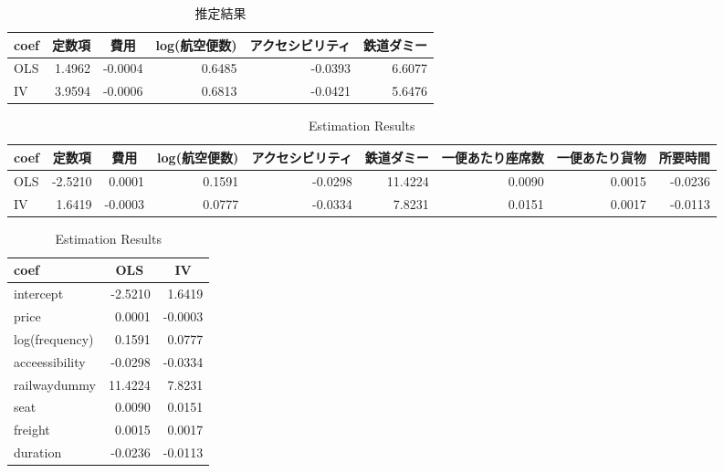 \documentclass{jsarticle}
\begin{document}
\begin{table}[h]
\caption{推定結果\label{coef}} 
\begin{center}
\begin{tabular}{lrrrrr}
\hline\hline
\multicolumn{1}{l}{coef}&\multicolumn{1}{c}{定数項}&\multicolumn{1}{c}{費用}&\multicolumn{1}{c}{log(航空便数)}&\multicolumn{1}{c}{アクセシビリティ}&\multicolumn{1}{c}{鉄道ダミー}\tabularnewline
\hline
OLS&1.4962&-0.0004&0.6485&-0.0393&6.6077\tabularnewline
IV&3.9594&-0.0006&0.6813&-0.0421&5.6476\tabularnewline
\hline
\end{tabular}\end{center}
\end{table}

\begin{table}[h]
\caption{Estimation Results\label{coef}} 
\begin{center}
\begin{tabular}{lrrrrrrrr}
\hline\hline
\multicolumn{1}{l}{coef}&\multicolumn{1}{c}{定数項}&\multicolumn{1}{c}{費用}&\multicolumn{1}{c}{log(航空便数)}&\multicolumn{1}{c}{アクセシビリティ}&\multicolumn{1}{c}{鉄道ダミー}&\multicolumn{1}{c}{一便あたり座席数}&\multicolumn{1}{c}{一便あたり貨物}&\multicolumn{1}{c}{所要時間}\tabularnewline
\hline
OLS&-2.5210&0.0001&0.1591&-0.0298&11.4224&0.0090&0.0015&-0.0236\tabularnewline
IV&1.6419&-0.0003&0.0777&-0.0334&7.8231&0.0151&0.0017&-0.0113\tabularnewline
\hline
\end{tabular}\end{center}
\end{table}

\begin{table}[h]
\caption{Estimation Results\label{coef}} 
\begin{center}
\begin{tabular}{lrr}
\hline\hline
\multicolumn{1}{l}{coef}&\multicolumn{1}{c}{OLS}&\multicolumn{1}{c}{IV}\tabularnewline
\hline
intercept&-2.5210&1.6419\tabularnewline
price&0.0001&-0.0003\tabularnewline
log(frequency)&0.1591&0.0777\tabularnewline
acceessibility&-0.0298&-0.0334\tabularnewline
railwaydummy&11.4224&7.8231\tabularnewline
seat&0.0090&0.0151\tabularnewline
freight&0.0015&0.0017\tabularnewline
duration&-0.0236&-0.0113\tabularnewline
\hline
\end{tabular}\end{center}
\end{table}
\end{document}

